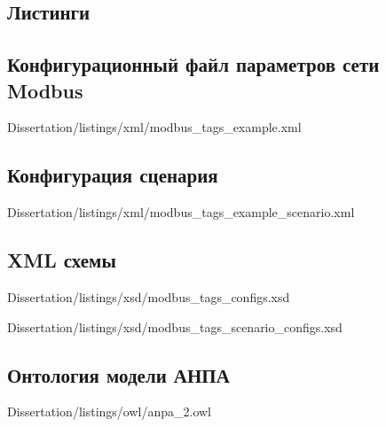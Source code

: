 \begin{landscape}
\chapter{Листинги}
\section{Конфигурационный файл параметров сети Modbus}\label{app:sec:modbus_tag}
    
            {Dissertation/listings/xml/modbus_tags_example.xml}
\end{landscape}

\section{Конфигурация сценария}\label{app:sec:modbus_scenario_example_diagram}

        {Dissertation/listings/xml/modbus_tags_example_scenario.xml}

\begin{landscape}
\section{XML схемы}\label{app:sec:xsd}
    
            {Dissertation/listings/xsd/modbus_tags_configs.xsd}
    
    
            {Dissertation/listings/xsd/modbus_tags_scenario_configs.xsd}        
\end{landscape}

\begin{landscape}
    \section{Онтология модели АНПА}\label{app:sec:anpa_owl}
    
            {Dissertation/listings/owl/anpa_2.owl}
\end{landscape}


